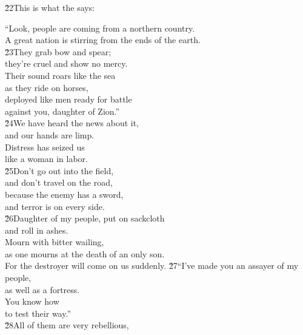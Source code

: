 \begin{poetry}
\poeml \v{22}This is what the  says:
\end{poetry}

\begin{poetry}
\poeml ``Look, people are coming from a northern country. \\
\poemll    A great nation is stirring from the ends of the earth. \\
\poeml \v{23}They grab bow and spear; \\
\poemll    they're cruel and show no mercy. \\
\poeml Their sound roars like the sea \\
\poemll    as they ride on horses, \\
\poeml deployed like men ready for battle \\
\poemll    against you, daughter of Zion.'' \\
\poeml \v{24}We have heard the news about it, \\
\poemll    and our hands are limp. \\
\poeml Distress has seized us \\
\poemll    like a woman in labor. \\
\poeml \v{25}Don't go out into the field, \\
\poemll    and don't travel on the road, \\
\poeml because the enemy has a sword, \\
\poemll    and terror is on every side. \\
\poeml \v{26}Daughter of my people, put on sackcloth \\
\poemll    and roll in ashes. \\
\poeml Mourn with bitter wailing, \\
\poemll    as one mourns at the death of an only son. \\
\poeml For the destroyer will come on us suddenly.
\poeml \v{27}``I've made you an assayer of my people, \\
\poemll    as well as a fortress. \\
\poeml You know how \\
\poemll    to test their way.'' \\
\poeml \v{28}All of them are very rebellious, \\

\end{poetry}
